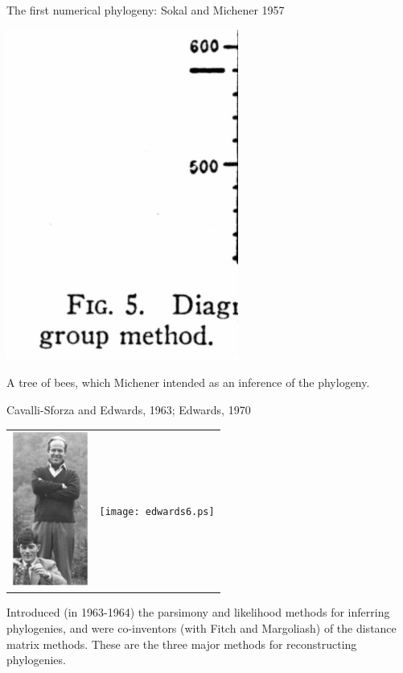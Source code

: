 \documentclass[pdf,bluish,slideColor,colorBG]{prosper}
\begin{document}
\begin{slide}[Replace]{The first numerical phylogeny: Sokal and Michener 1957}

\begin{center}
\includegraphics[width=3.0in]{sokaltree.ps}
\end{center}

A tree of bees, which Michener intended as an inference of the phylogeny.

\end{slide}

\begin{slide}[Replace]{Cavalli-Sforza and Edwards, 1963; Edwards, 1970}

\begin{center}
\begin{tabular}{r l}
\includegraphics[height=2in]{cavedwards3.ps} &
\texttt{[image: edwards6.ps]}
\end{tabular}
\end{center}
\medskip

Introduced (in 1963-1964) the parsimony and likelihood methods for inferring phylogenies,
and were co-inventors (with Fitch and Margoliash) of the distance matrix
methods.  These are the three major methods for reconstructing phylogenies.

\end{slide}
\end{document}
